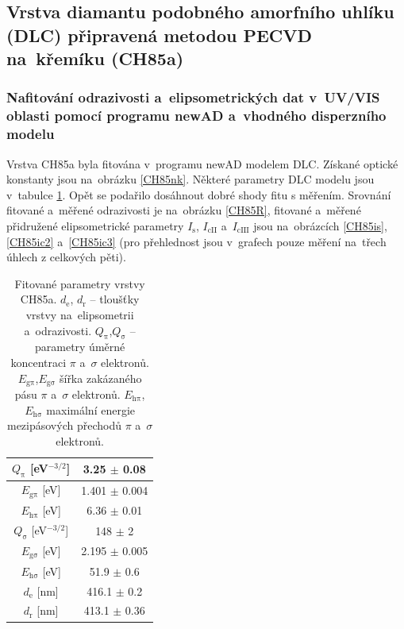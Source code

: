 \documentclass[12pt]{article}
\begin{document}
\subsection{Vrstva diamantu podobného amorfního uhlíku (DLC) připravená metodou PECVD na~křemíku (CH85a)}
\subsubsection{Nafitování odrazivosti a~elipsometrických dat v~UV/VIS oblasti pomocí programu newAD a~vhodného disperzního modelu }

Vrstva CH85a byla fitována v~programu newAD modelem DLC. Získané optické konstanty jsou na~obrázku \ref{CH85nk}. Některé parametry DLC modelu jsou v~tabulce \ref{CHfit}. Opět se podařilo dosáhnout dobré shody fitu s měřením. Srovnání fitované a~měřené odrazivosti je na~obrázku \ref{CH85R}, fitované a~měřené přidružené elipsometrické parametry $I_\mathrm{s}$, $I_\mathrm{cII}$ a~$I_\mathrm{cIII}$ jsou na~obrázcích \ref{CH85is},\ref{CH85ic2} a~\ref{CH85ic3} (pro přehlednost jsou v~grafech pouze měření na~třech úhlech z celkových pěti).

\begin{table}[htbp]
\begin{center}
\begin{tabular}{|c|c|}
\hline
 $Q_\mathrm{\pi}$ [eV$^{-3/2}$] & 3.25 $\pm$ 0.08  \\ \hline
 $E_\mathrm{g\pi}$ [eV] & 1.401 $\pm$ 0.004 \\ \hline
 $E_\mathrm{h\pi}$ [eV] & 6.36 $\pm$ 0.01 \\ \hline 
 $Q_\mathrm{\sigma}$ [eV$^{-3/2}$] & 148 $\pm$ 2 \\ \hline
 $E_\mathrm{g\sigma}$ [eV] & 2.195 $\pm$ 0.005 \\ \hline
 $E_\mathrm{h\sigma}$ [eV] & 51.9 $\pm$ 0.6 \\ \hline
 $d_\mathrm{e}$ [nm] & 416.1 $\pm$ 0.2 \\ \hline
 $d_\mathrm{r}$ [nm] & 413.1 $\pm$ 0.36 \\ \hline
\end{tabular}
\caption{Fitované parametry vrstvy CH85a. $d_\mathrm{e}$, $d_\mathrm{r}$ -- tloušťky vrstvy na~elipsometrii a~odrazivosti. $Q_\mathrm{\pi}$,$Q_\mathrm{\sigma}$ -- parametry úměrné koncentraci $\pi$ a~$\sigma$ elektronů. $E_\mathrm{g\pi}$,$E_\mathrm{g\sigma}$ šířka zakázaného pásu $\pi$ a~$\sigma$ elektronů. $E_\mathrm{h\pi}$,$E_\mathrm{h\sigma}$ maximální energie mezipásových přechodů $\pi$ a~$\sigma$ elektronů.   }
\label{CHfit}
\end{center}
\end{table}
\end{document}
